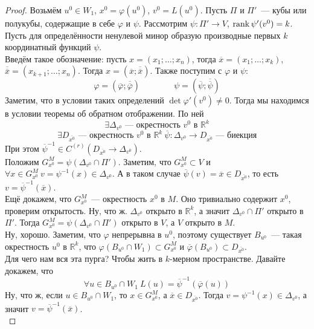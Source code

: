 \documentclass{article}
\let\tmp\varphi
\let\varphi\phi
\let\phi\tmp
\begin{document}
    \begin{proof}
        Возьмём $u^0\in W_1$, $x^0=\phi(u^0)$, $v^0=L(u^0)$. Пусть $\Pi$ и $\Pi'$~--- кубы или полукубы, содержащие в себе $\phi$ и $\psi$. Рассмотрим $\psi\colon\Pi'\to V$, $\operatorname{rank}\psi'(v^0)=k$. Пусть для определённости ненулевой минор образую производные первых $k$ координатный функций $\psi$.\\
        Введём такое обозначение: пусть $x=(x_1;\ldots;x_n)$, тогда $\overline x=(x_1;\ldots;x_k)$, $\overline{\overline x}=(x_{k+1};\ldots;x_n)$. Тогда $x=(\overline x;\overline{\overline x})$. Также поступим с $\phi$ и $\psi$:
        $$
        \phi=(\overline\phi;\overline{\overline\phi})\qquad\qquad \psi=(\overline\psi;\overline{\overline\psi})
        $$
        Заметим, что в условии таких определений $\det\phi'(v^0)\neq0$. Тогда мы находимся в условии теоремы об обратном отображении. По ней
        $$
        \exists\Delta_{v^0}\text{~--- окрестность }v^0\text{ в }\mathbb R^k
        $$
        $$
        \exists D_{\overline{x^0}}\text{~--- окрестность }v^0\text{ в }\mathbb R^k~\overline\psi\colon\Delta_{v^0}\to D_{\overline{x^0}}\text{~--- биекция}
        $$
        При этом ${\overline\psi}^{-1}\in C^{(r)}(D_{\overline{x^0}}\to\Delta_{v^0})$.\\
        Положим $G_{x^0}^M=\psi(\Delta_{v^0}\cap\Pi')$. Заметим, что $G_{x^0}^M\subset V$ и $\forall x\in G_{x^0}^M~v=\psi^{-1}(x)\in\Delta_{v^0}$. А в таком случае $\overline\psi(v)=\overline x\in D_{\overline{x^0}}$, то есть $v={\overline\psi}^{-1}(\overline x)$.\\
        Ещё докажем, что $G_{x^0}^M$~--- окрестность $x^0$ в $M$. Оно тривиально содержит $x^0$, проверим открытость. Ну, что ж. $\Delta_{v^0}$ открыто в $\mathbb R^k$, а значит $\Delta_{v^0}\cap \Pi'$ открыто в $\Pi'$. Тогда $G_{x^0}^M=\psi(\Delta_{v^0}\cap\Pi')$ открыто в $V$, а $V$ открыто в $M$.\\
        Ну, хорошо. Заметим, что $\phi$ непрерывна в $u^0$, поэтому существует $B_{u^0}$~--- такая окрестность $u^0$ в $\mathbb R^k$, что $\phi(B_{u^0}\cap W_1)\subset G_{x^0}^M$ и $\overline\phi(B_{u^0})\subset D_{\overline{x^0}}$.\\
        Для чего нам вся эта пурга? Чтобы жить в $k$-мерном пространстве. Давайте докажем, что
        $$
        \forall u\in B_{u^0}\cap W_1~L(u)={\overline\psi}^{-1}(\overline\phi(u))
        $$
        Ну, что ж, если $u\in B_{u^0}\cap W_1$, то $x\in G_{x^0}^M$, а $\overline x\in D_{\overline{x^0}}$. Тогда $v=\psi^{-1}(x)\in\Delta_{v^0}$, а значит $v={\overline\psi}^{-1}(\overline x)$.\\

\end{proof}
\end{document}
